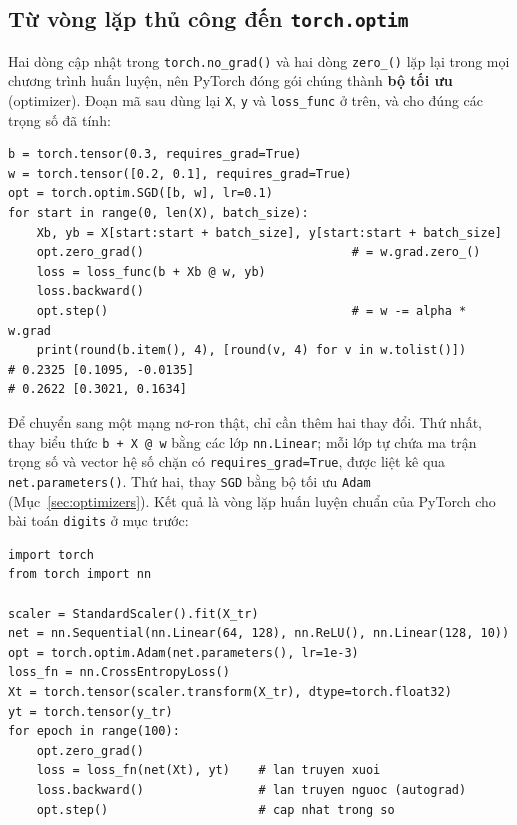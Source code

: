 \subsection{Từ vòng lặp thủ công đến \texttt{torch.optim}}

Hai dòng cập nhật trong \texttt{torch.no\_grad()} và hai dòng \texttt{zero\_()} lặp lại trong mọi chương trình huấn luyện, nên PyTorch đóng gói chúng thành \textbf{bộ tối ưu} (optimizer). Đoạn mã sau dùng lại \texttt{X}, \texttt{y} và \texttt{loss\_func} ở trên, và cho đúng các trọng số đã tính:

\begin{lstlisting}[caption={Thay phần cập nhật thủ công bằng torch.optim.SGD}]
b = torch.tensor(0.3, requires_grad=True)
w = torch.tensor([0.2, 0.1], requires_grad=True)
opt = torch.optim.SGD([b, w], lr=0.1)
for start in range(0, len(X), batch_size):
    Xb, yb = X[start:start + batch_size], y[start:start + batch_size]
    opt.zero_grad()                             # = w.grad.zero_()
    loss = loss_func(b + Xb @ w, yb)
    loss.backward()
    opt.step()                                  # = w -= alpha * w.grad
    print(round(b.item(), 4), [round(v, 4) for v in w.tolist()])
# 0.2325 [0.1095, -0.0135]
# 0.2622 [0.3021, 0.1634]
\end{lstlisting}

Để chuyển sang một mạng nơ-ron thật, chỉ cần thêm hai thay đổi. Thứ nhất, thay biểu thức \texttt{b + X @ w} bằng các lớp \texttt{nn.Linear}; mỗi lớp tự chứa ma trận trọng số và vector hệ số chặn có \texttt{requires\_grad=True}, được liệt kê qua \texttt{net.parameters()}. Thứ hai, thay \texttt{SGD} bằng bộ tối ưu \texttt{Adam} (Mục~\ref{sec:optimizers}). Kết quả là vòng lặp huấn luyện chuẩn của PyTorch cho bài toán \texttt{digits} ở mục trước:

\begin{lstlisting}[caption={Vòng lặp huấn luyện tối giản với PyTorch}]
import torch
from torch import nn

scaler = StandardScaler().fit(X_tr)
net = nn.Sequential(nn.Linear(64, 128), nn.ReLU(), nn.Linear(128, 10))
opt = torch.optim.Adam(net.parameters(), lr=1e-3)
loss_fn = nn.CrossEntropyLoss()
Xt = torch.tensor(scaler.transform(X_tr), dtype=torch.float32)
yt = torch.tensor(y_tr)
for epoch in range(100):
    opt.zero_grad()
    loss = loss_fn(net(Xt), yt)    # lan truyen xuoi
    loss.backward()                # lan truyen nguoc (autograd)
    opt.step()                     # cap nhat trong so
\end{lstlisting}

